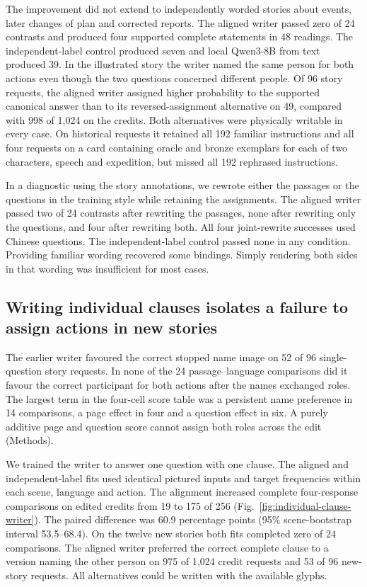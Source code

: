 \documentclass[12pt,a4paper]{article}
\providecommand{\DIFadd}[1]{{\protect\color{blue} \sf #1}} %
\begin{document}
\DIFadd{The improvement did not extend to independently worded stories about events, later changes of plan and corrected reports. The aligned writer passed zero of 24 contrasts and produced four supported complete statements in 48 readings. The independent-label control produced seven and local Qwen3-8B from text produced 39. In the illustrated story the writer named the same person for both actions even though the two questions concerned different people. Of 96 story requests, the aligned writer assigned higher probability to the supported canonical answer than to its reversed-assignment alternative on 49, compared with 998 of 1,024 on the credits. Both alternatives were physically writable in every case. On historical requests it retained all 192 familiar instructions and all four requests on a card containing oracle and bronze exemplars for each of two characters, speech and expedition, but missed all 192 rephrased instructions.
}

\DIFadd{In a diagnostic using the story annotations, we rewrote either the passages or the questions in the training style while retaining the assignments. The aligned writer passed two of 24 contrasts after rewriting the passages, none after rewriting only the questions, and four after rewriting both. All four joint-rewrite successes used Chinese questions. The independent-label control passed none in any condition. Providing familiar wording recovered some bindings. Simply rendering both sides in that wording was insufficient for most cases.
}

\subsection*{\DIFadd{Writing individual clauses isolates a failure to assign actions in new stories}}
\DIFadd{The earlier writer favoured the correct stopped name image on 52 of 96 single-question story requests. In none of the 24 passage--language comparisons did it favour the correct participant for both actions after the names exchanged roles. The largest term in the four-cell score table was a persistent name preference in 14 comparisons, a page effect in four and a question effect in six. A purely additive page and question score cannot assign both roles across the edit (Methods).
}

\DIFadd{We trained the writer to answer one question with one clause. The aligned and independent-label fits used identical pictured inputs and target frequencies within each scene, language and action. The alignment increased complete four-response comparisons on edited credits from 19 to 175 of 256 (Fig.~\ref{fig:individual-clause-writer}). The paired difference was 60.9 percentage points (95\% scene-bootstrap interval 53.5--68.4). On the twelve new stories both fits completed zero of 24 comparisons. The aligned writer preferred the correct complete clause to a version naming the other person on 975 of 1,024 credit requests and 53 of 96 new-story requests. All alternatives could be written with the available glyphs.
}
\end{document}
